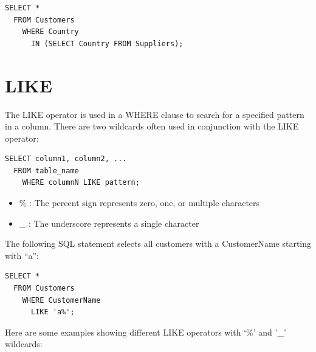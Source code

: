 \documentclass[
]{book}
\providecommand{\tightlist}{%
  \setlength{\itemsep}{0pt}\setlength{\parskip}{0pt}}
\begin{document}
\begin{verbatim}
SELECT * 
  FROM Customers
    WHERE Country 
      IN (SELECT Country FROM Suppliers);
\end{verbatim}

\hypertarget{like}{%
\section{LIKE}\label{like}}

The LIKE operator is used in a WHERE clause to search for a specified pattern in a column. There are two wildcards often used in conjunction with the LIKE operator:

\begin{verbatim}
SELECT column1, column2, ...
  FROM table_name
    WHERE columnN LIKE pattern;
\end{verbatim}

\begin{itemize}
\tightlist
\item
  \% : The percent sign represents zero, one, or multiple characters
\item
  \_ : The underscore represents a single character
\end{itemize}

The following SQL statement selects all customers with a CustomerName starting with ``a'':

\begin{verbatim}
SELECT * 
  FROM Customers
    WHERE CustomerName 
      LIKE 'a%';
\end{verbatim}

Here are some examples showing different LIKE operators with `\%' and '\_' wildcards:
\end{document}
